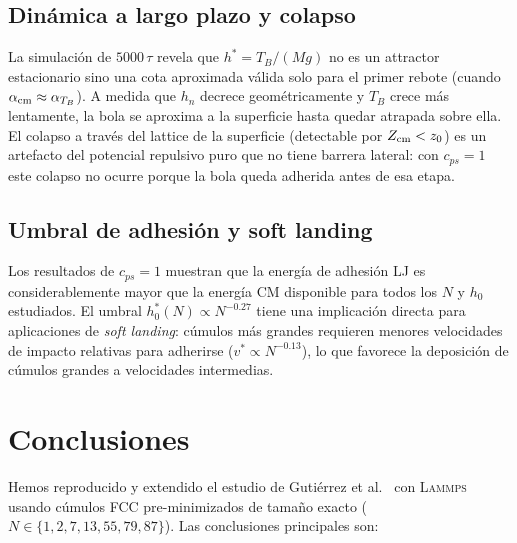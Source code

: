 \documentclass[aps,pre,twocolumn,reprint,superscriptaddress]{revtex4-2}
\newcommand{\lammps}{\textsc{Lammps}}
\begin{document}
\subsection{Dinámica a largo plazo y colapso}
\label{sec:largo_discusion}

La simulación de $5000\,\tau$ revela que $h^*=T_B/(Mg)$ no es un attractor
estacionario sino una cota aproximada válida solo para el primer rebote
(cuando $\alpha_{\rm cm}\approx\alpha_{T_B}$). A medida que $h_n$ decrece
geométricamente y $T_B$ crece más lentamente, la bola se aproxima a la
superficie hasta quedar atrapada sobre ella. El colapso a través del lattice
de la superficie (detectable por $Z_{\rm cm}<z_0$) es un artefacto del
potencial repulsivo puro que no tiene barrera lateral: con $c_{ps}=1$
este colapso no ocurre porque la bola queda adherida antes de esa etapa.

\subsection{Umbral de adhesión y soft landing}
\label{sec:adhesion_discusion}

Los resultados de $c_{ps}=1$ muestran que la energía de adhesión LJ es
considerablemente mayor que la energía CM disponible para todos los $N$
y $h_0$ estudiados. El umbral $h_0^*(N)\propto N^{-0.27}$ tiene una implicación
directa para aplicaciones de \emph{soft landing}: cúmulos más grandes requieren
menores velocidades de impacto relativas para adherirse ($v^*\propto N^{-0.13}$),
lo que favorece la deposición de cúmulos grandes a velocidades intermedias.

\section{Conclusiones}
\label{sec:conclusiones}

Hemos reproducido y extendido el estudio de Gutiérrez et al.~\cite{Gutierrez2012}
con \lammps{} usando cúmulos FCC pre-minimizados de tamaño exacto
($N\in\{1,2,7,13,55,79,87\}$). Las conclusiones principales son:
\end{document}
